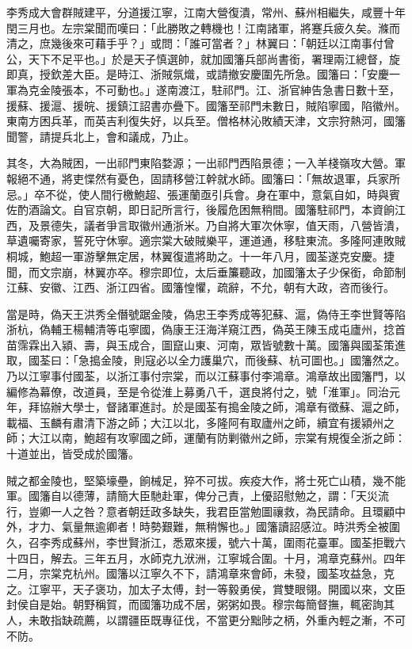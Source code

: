 \begin{pinyinscope}
李秀成大會群賊建平，分道援江寧，江南大營復潰，常州、蘇州相繼失，咸豐十年閏三月也。左宗棠聞而嘆曰：「此勝敗之轉機也！江南諸軍，將蹇兵疲久矣。滌而清之，庶幾後來可藉手乎？」或問：「誰可當者？」林翼曰：「朝廷以江南事付曾公，天下不足平也。」於是天子慎選帥，就加國籓兵部尚書銜，署理兩江總督，旋即真，授欽差大臣。是時江、浙賊氛熾，或請撤安慶圍先所急。國籓曰：「安慶一軍為克金陵張本，不可動也。」遂南渡江，駐祁門。江、浙官紳告急書日數十至，援蘇、援滬、援皖、援鎮江詔書亦疊下。國籓至祁門未數日，賊陷寧國，陷徽州。東南方困兵革，而英吉利復失好，以兵至。僧格林沁敗績天津，文宗狩熱河，國籓聞警，請提兵北上，會和議成，乃止。

其冬，大為賊困，一出祁門東陷婺源；一出祁門西陷景德；一入羊棧嶺攻大營。軍報絕不通，將吏惵然有憂色，固請移營江幹就水師。國籓曰：「無故退軍，兵家所忌。」卒不從，使人間行檄鮑超、張運蘭亟引兵會。身在軍中，意氣自如，時與賓佐酌酒論文。自官京朝，即日記所言行，後履危困無稍間。國籓駐祁門，本資餉江西，及景德失，議者爭言取徽州通浙米。乃自將大軍次休寧，值天雨，八營皆潰，草遺囑寄家，誓死守休寧。適宗棠大破賊樂平，運道通，移駐東流。多隆阿連敗賊桐城，鮑超一軍游擊無定居，林翼復遣將助之。十一年八月，國荃遂克安慶。捷聞，而文宗崩，林翼亦卒。穆宗即位，太后垂簾聽政，加國籓太子少保銜，命節制江蘇、安徽、江西、浙江四省。國籓惶懼，疏辭，不允，朝有大政，咨而後行。

當是時，偽天王洪秀全僭號踞金陵，偽忠王李秀成等犯蘇、滬，偽侍王李世賢等陷浙杭，偽輔王楊輔清等屯寧國，偽康王汪海洋窺江西，偽英王陳玉成屯廬州，捻首苗霈霖出入潁、壽，與玉成合，圖竄山東、河南，眾皆號數十萬。國籓與國荃策進取，國荃曰：「急搗金陵，則寇必以全力護巢穴，而後蘇、杭可圖也。」國籓然之。乃以江寧事付國荃，以浙江事付宗棠，而以江蘇事付李鴻章。鴻章故出國籓門，以編修為幕僚，改道員，至是令從淮上募勇八千，選良將付之，號「淮軍」。同治元年，拜協辦大學士，督諸軍進討。於是國荃有搗金陵之師，鴻章有徵蘇、滬之師，載福、玉麟有肅清下游之師；大江以北，多隆阿有取廬州之師，續宜有援潁州之師；大江以南，鮑超有攻寧國之師，運蘭有防剿徽州之師，宗棠有規復全浙之師：十道並出，皆受成於國籓。

賊之都金陵也，堅築壕壘，餉械足，猝不可拔。疾疫大作，將士死亡山積，幾不能軍。國籓自以德薄，請簡大臣馳赴軍，俾分己責，上優詔慰勉之，謂：「天災流行，豈卿一人之咎？意者朝廷政多缺失，我君臣當勉圖禳救，為民請命。且環顧中外，才力、氣量無逾卿者！時勢艱難，無稍懈也。」國籓讀詔感泣。時洪秀全被圍久，召李秀成蘇州，李世賢浙江，悉眾來援，號六十萬，圍雨花臺軍。國荃拒戰六十四日，解去。三年五月，水師克九洑洲，江寧城合圍。十月，鴻章克蘇州。四年二月，宗棠克杭州。國籓以江寧久不下，請鴻章來會師，未發，國荃攻益急，克之。江寧平，天子褒功，加太子太傅，封一等毅勇侯，賞雙眼翎。開國以來，文臣封侯自是始。朝野稱賀，而國籓功成不居，粥粥如畏。穆宗每簡督撫，輒密詢其人，未敢指缺疏薦，以謂疆臣既專征伐，不當更分黜陟之柄，外重內輕之漸，不可不防。


\end{pinyinscope}

